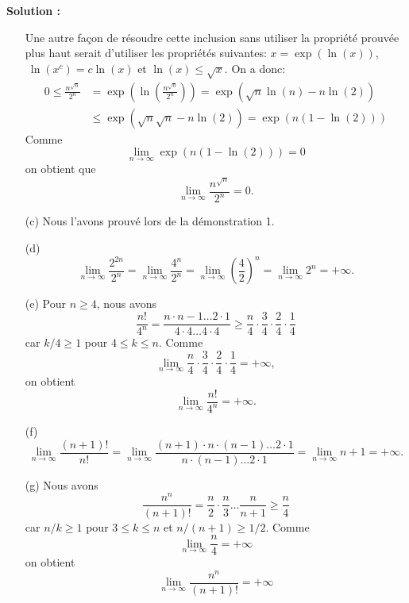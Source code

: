 \documentclass[11pt]{article} %
\newenvironment{solution}[1][\unskip]{%
	\par
	\noindent
	\textbf{Solution #1:}
	\noindent}
{\medskip}
\begin{document}
\begin{solution}
\begin{itemize}
	\vfill
	Une autre façon de résoudre cette inclusion sans utiliser la propriété prouvée plus haut serait d'utiliser les propriétés suivantes:  $x = \exp(\ln(x))$, $\ \ln(x^c) = c\ln(x)$ et  $\ln(x)\leq \sqrt{x}$. On a donc:
\begin{align*}
0 \leq \frac{n^{\sqrt{n}}}{2^n} &= \exp( \ln(   \frac{n^{\sqrt{n}}}{2^n} )) = \exp( \sqrt{n}\ln(n)-n\ln(2)) \\
&\leq \exp(\sqrt{n} \sqrt{n}-n\ln(2)) = \exp(n(1-\ln(2)))
\end{align*}
Comme 
		$$\lim\limits_{n\rightarrow \infty} \exp(n(1-\ln(2)))=0$$
		on obtient que 
		$$\lim\limits_{n\rightarrow \infty}\frac{n^{\sqrt{n}}}{2^n}=0.$$

\item [(c)] Nous l'avons prouvé lors de la démonstration 1.
		\item [(d)] 
		\begin{equation*}
		\lim\limits_{n\rightarrow \infty}\frac{2^{2n}}{2^n}
		=\lim\limits_{n\rightarrow \infty}\frac{4^{n}}{2^n}
		=\lim\limits_{n\rightarrow \infty}\left(\frac{4}{2}\right)^n
		=\lim\limits_{n\rightarrow \infty}{2^n}
		=+\infty.
		\end{equation*}
		\item[(e)]
		Pour $n\geq 4$, nous avons
		\begin{equation*}
		\frac{n!}{4^n}
		=\frac{n\cdot n-1 \dots 2 \cdot 1}{4\cdot 4 \dots 4\cdot 4}
		\geq\frac{n}{4} \cdot\frac{3}{4} \cdot\frac{2}{4} \cdot\frac{1}{4}
		\end{equation*}
		car $k/4\geq 1$ pour $4\leq k\leq n$. Comme
		$$\lim\limits_{n\rightarrow \infty} \frac{n}{4} \cdot\frac{3}{4} \cdot\frac{2}{4} \cdot\frac{1}{4} = +\infty, $$
		on obtient 
		$$\lim\limits_{n\rightarrow \infty}\frac{n!}{4^n} = +\infty.$$
		\item[(f)]
		\begin{equation*}
		\lim\limits_{n\rightarrow \infty}\frac{(n+1)!}{n!}
		=\lim\limits_{n\rightarrow \infty}\frac{(n+1)\cdot n \cdot (n-1) \dots 2 \cdot 1}{n \cdot (n-1) \dots 2 \cdot 1}
		=\lim\limits_{n\rightarrow \infty}n+1 = +\infty.
		\end{equation*}
		\item[(g)]
		Nous avons
		\begin{equation*}
		\frac{n^n}{(n+1)!}= \frac{n}{2}\cdot \frac{n}{3} \dots \frac{n}{n+1} \geq \frac{n}{4}
		\end{equation*}
		car $n/k \geq 1$ pour $3\leq k \leq n$ et $n/(n+1)\geq 1/2$.
		Comme
		$$\lim\limits_{n\rightarrow \infty} \frac{n}{4}=+\infty$$
		on obtient
		$$\lim\limits_{n\rightarrow \infty} \frac{n^n}{(n+1)!}=+\infty$$ 
	\end{itemize}
\end{solution}
\end{document}
